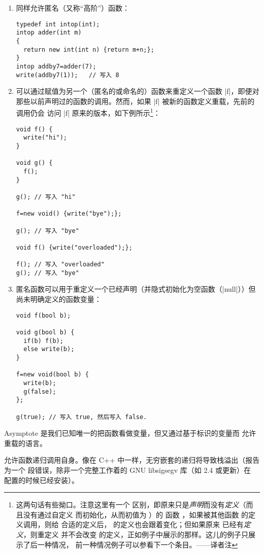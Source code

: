 \documentclass[nofonts,CJKnormalspaces]{ctexbook}[2009/05/20]
\newcommand*\prgname[1]{\textsf{#1}}
\newcommand\transnote[1]{\footnote{#1——译者注}}
\begin{document}
{{{\begin{enumerate}
\item 同样允许匿名（又称“高阶”）函数：
\begin{lstlisting}
typedef int intop(int);
intop adder(int m)
{
  return new int(int n) {return m+n;};
}
intop addby7=adder(7);
write(addby7(1));   // 写入 8
\end{lstlisting}

\item 可以通过赋值为另一个（匿名的或命名的）函数来重定义一个函数 |f|，即便对
那些以前声明过的函数的调用。然而，如果 |f| 被新的函数定义重载，先前的调用仍会
访问 |f| 原来的版本，如下例所示\transnote{这两句话有些拗口。注意这里有一个
区别，即原来只是\emph{声明}而没有\emph{定义}（而且没有通过自定义
\inlinecode{operator init()} 而初始化，从而初值为 \inlinecode{null}）的
函数 \inlinecode{f}，如果被其他函数 \inlinecode{g} 的定义调用，则给
\inlinecode{f} 合适的定义后，\inlinecode{g} 的定义也会跟着变化；但如果原来
\inlinecode{f} 已经有\emph{定义}，则重定义 \inlinecode{f} 并不会改变
\inlinecode{g} 的定义，正如例子中展示的那样。这儿的例子只展示了后一种情况，
前一种情况例子可以参看下一个条目。}：
\begin{lstlisting}
void f() {
  write("hi");
}

void g() {
  f();
}

g(); // 写入 "hi"

f=new void() {write("bye");};

g(); // 写入 "bye"

void f() {write("overloaded");};

f(); // 写入 "overloaded"
g(); // 写入 "bye"
\end{lstlisting}

\item 匿名函数可以用于重定义一个已经声明（并隐式初始化为空函数（|null|））但
尚未明确定义的函数变量：
\begin{lstlisting}
void f(bool b);

void g(bool b) {
  if(b) f(b);
  else write(b);
}

f=new void(bool b) {
  write(b);
  g(false);
};

g(true); // 写入 true, 然后写入 false.
\end{lstlisting}
\end{enumerate}

\prgname{Asymptote} 是我们已知唯一的把函数看做变量，但又通过基于标识的变量而
允许重载的语言。

允许函数递归调用自身。像在 C++ 中一样，无穷嵌套的递归将导致栈溢出（报告为一个
段错误，除非一个完整工作着的 GNU \prgname{libsigsegv} 库（如 2.4 或更新）在
配置的时候已经安装）。

}}}
\end{document}
